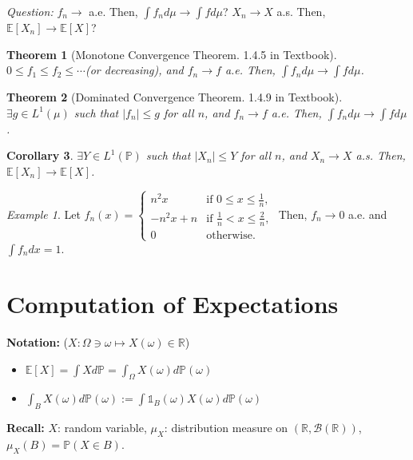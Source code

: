 \documentclass[12pt]{report}
\renewcommand{\1}{\mathbb{1}}
\theoremstyle{break}
\newtheorem{thm}{Theorem}[section] %
\theoremstyle{newdef}
\newtheorem{cor}[thm]{Corollary}
\theoremstyle{remark}
\newtheorem*{exmp}{Example} %
\begin{document}
\textit{Question:}
$f_n \rightarrow $ a.e. Then, $\int f_nd\mu \rightarrow \int fd\mu$?
$X_n \rightarrow X$ a.s. Then, $\mathbb{E}[X_n] \rightarrow \mathbb{E}[X]$?


\begin{thm}[Monotone Convergence Theorem. 1.4.5 in Textbook]
$0 \leq f_1 \leq f_2 \leq \cdots$(or decreasing), and $f_n \rightarrow f$ a.e.
Then, $\int f_nd\mu \rightarrow \int fd\mu$.
\end{thm}

\begin{thm}[Dominated Convergence Theorem. 1.4.9 in Textbook]
$\exists g \in L^1(\mu)$ such that $|f_n| \leq g$ for all $n$, and $f_n \rightarrow f$ a.e.
Then, $\int f_n d\mu \rightarrow \int f d\mu$.
\end{thm}

\begin{cor}
$\exists Y \in L^1(\mathbb{P})$ such that $|X_n| \leq Y$ for all $n$, and $X_n \rightarrow X$ a.s.
Then, $\mathbb{E}[X_n] \rightarrow \mathbb{E}[X]$.
\end{cor}

\begin{exmp}
Let $f_n(x) = 
\begin{cases}
n^2x & \text{if } 0 \leq x \leq \frac{1}{n},\\
-n^2x + n & \text{if } \frac{1}{n} < x \leq \frac{2}{n},\\
0 & \text{otherwise}.
\end{cases}
$
Then, $f_n \rightarrow 0$ a.e. and $\int f_n dx = 1$.
\end{exmp}

\section{Computation of Expectations}

\textbf{Notation:} ($X : \Omega \ni \omega \mapsto X(\omega) \in \mathbb{R}$)
\begin{itemize}
\item $\mathbb{E}[X] = \int X d\mathbb{P} = \int_\Omega X(\omega) d\mathbb{P}(\omega)$
\item $\int_B X(\omega)d\mathbb{P}(\omega) := \int \mathbb{1}_B(\omega) X(\omega) d\mathbb{P}(\omega)$
\end{itemize}

\textbf{Recall:} $X$: random variable, $\mu_X$: distribution measure on $(\mathbb{R}, \mathcal{B}(\mathbb{R}))$,
$\mu_X(B) = \mathbb{P}(X \in B)$.
\end{document}
